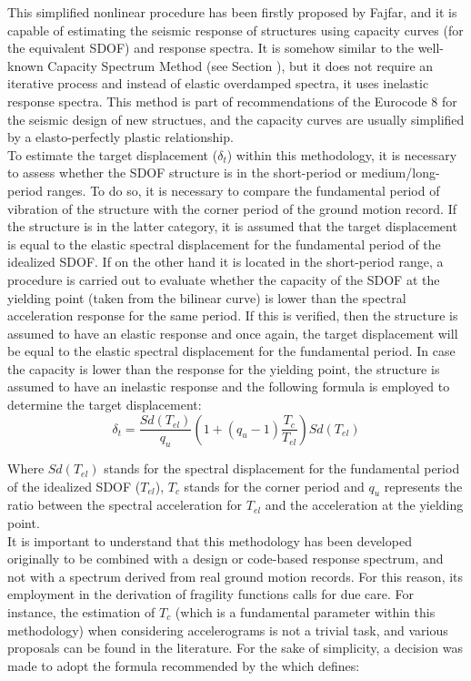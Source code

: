 This simplified nonlinear procedure has been firstly proposed by Fajfar, and it is capable of estimating the seismic response of structures using capacity curves (for the equivalent SDOF) and response spectra. It is somehow similar to the well-known Capacity Spectrum Method (see Section ), but it does not require an iterative process and instead of elastic overdamped spectra, it uses inelastic response spectra. This method is part of recommendations of the Eurocode 8 \citep{CEN2005} for the seismic design of new structues, and the capacity curves are usually simplified by a elasto-perfectly plastic relationship.\\

To estimate the target displacement ($\delta_t$) within this methodology, it is necessary to assess whether the SDOF structure is in the short-period or medium/long-period ranges. To do so, it is necessary to compare the fundamental period of vibration of the structure with the corner period of the ground motion record. If the structure is in the latter category, it is assumed that the target displacement is equal to the elastic spectral displacement for the fundamental period of the idealized SDOF. If on the other hand it is located in the short-period range, a procedure is carried out to evaluate whether the capacity of the SDOF at the yielding point (taken from the bilinear curve) is lower than the spectral acceleration response for the same period. If this is verified, then the structure is assumed to have an elastic response and once again, the target displacement will be equal to the elastic spectral displacement for the fundamental period. In case the capacity is lower than the response for the yielding point, the structure is assumed to have an inelastic response and the following formula is employed to determine the target displacement:
\begin{equation}
\delta_t = \frac{Sd(T_{el})}{q_u}\left(1+(q_u-1)\frac{T_c}{T_{el}}\right)Sd(T_{el})
\end{equation}

Where $Sd(T_{el})$ stands for the spectral displacement for the fundamental period of the idealized SDOF ($T_{el}$), $T_c$ stands for the corner period and $q_u$ represents the ratio between the spectral acceleration for $T_{el}$ and the acceleration at the yielding point.\\

It is important to understand that this methodology has been developed originally to be combined with a design or code-based response spectrum, and not with a spectrum derived from real ground motion records. For this reason, its employment in the derivation of fragility functions calls for due care. For instance, the estimation of $T_c$ (which is a fundamental parameter within this methodology) when considering accelerograms is not a trivial task, and various proposals can be found in the literature. For the sake of simplicity, a decision was made to adopt the formula recommended by the \cite{ASCE2010} which defines:

